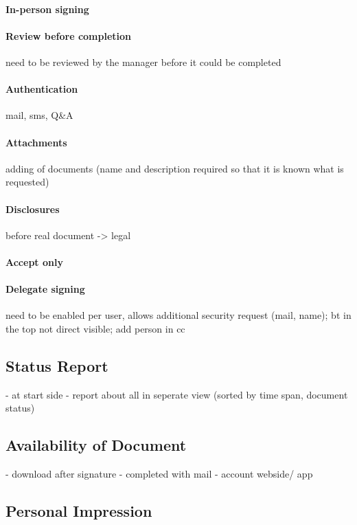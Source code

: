 \paragraph{In-person signing}

\paragraph{Review before completion} need to be reviewed by the manager before it could be completed

\paragraph{Authentication} mail, sms, Q\&A

\paragraph{Attachments} adding of documents (name and description required so that it is known what is requested)

\paragraph{Disclosures} before real document -> legal

\paragraph{Accept only}

\paragraph{Delegate signing} need to be enabled per user, allows additional security request (mail, name); bt in the top not direct visible; add person in cc

\subsection{Status Report}
- at start side
- report about all in seperate view (sorted by time span, document status)

\subsection{Availability of Document}
- download after signature
- completed with mail
- account webside/ app

\subsection{Personal Impression}